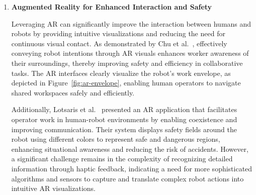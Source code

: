 \begin{enumerate}
    \item \textbf{Augmented Reality for Enhanced Interaction and Safety}
    
    Leveraging \ac{AR} can significantly improve the interaction between humans and robots by providing intuitive visualizations and reducing the need 
    for continuous visual contact. As demonstrated by Chu et al.~\cite{Chu2023}, effectively conveying robot intentions through \ac{AR} visuals enhances 
    worker awareness of their surroundings, thereby improving safety and efficiency in collaborative tasks. The \ac{AR} interfaces clearly visualize the 
    robot's work envelope, as depicted in Figure~\ref{fig:ar-envelope}, enabling human operators to navigate shared workspaces safely and efficiently.
    
    Additionally, Lotsaris et al.~\cite{LOTSARIS2021301} presented an \ac{AR} application that facilitates operator work in human-robot environments by 
    enabling coexistence and improving communication. Their system displays safety fields around the robot using different colors to represent safe and 
    dangerous regions, enhancing situational awareness and reducing the risk of accidents. However, a significant challenge remains in the complexity of
     recognizing detailed information through haptic feedback, indicating a need for more sophisticated algorithms and sensors to capture and translate 
     complex robot actions into intuitive \ac{AR} visualizations.
    

\end{enumerate}
